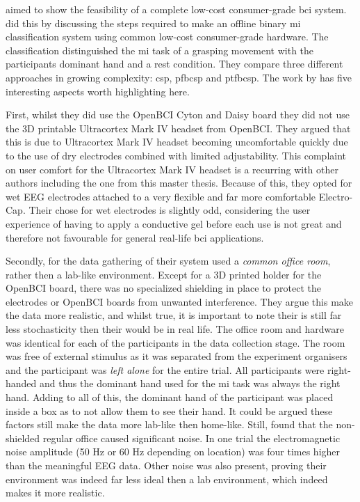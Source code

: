  aimed to show the feasibility of a complete low-cost consumer-grade \gls{bci} system.
 did this by discussing the steps required to make an offline binary \gls{mi} classification system using common low-cost consumer-grade hardware.
The classification distinguished the \gls{mi} task of a grasping movement with the participants dominant hand and a rest condition.
They compare three different approaches in growing complexity: \gls{csp}, \gls{pfbcsp} and \gls{ptfbcsp}.
The work by \citet{cheap_bci_feasibility} has five interesting aspects worth highlighting here.

First, whilst they did use the OpenBCI Cyton and Daisy board they did not use the 3D printable Ultracortex Mark IV headset from OpenBCI.
They argued that this is due to Ultracortex Mark IV headset becoming uncomfortable quickly due to the use of dry electrodes combined with limited adjustability.
This complaint on user comfort for the Ultracortex Mark IV headset is a recurring with other authors including the one from this master thesis.
Because of this, they opted for wet EEG electrodes attached to a very flexible and far more comfortable Electro-Cap.
Their chose for wet electrodes is slightly odd, considering the user experience of having to apply a conductive gel before each use is not great and therefore not favourable for general real-life \gls{bci} applications.

Secondly, for the data gathering of their system \citet{cheap_bci_feasibility} used a \textit{common office room}, rather then a lab-like environment.
Except for a 3D printed holder for the OpenBCI board, there was no specialized shielding in place to protect the electrodes or OpenBCI boards from unwanted interference.
They argue this make the data more realistic, and whilst true, it is important to note their is still far less stochasticity then their would be in real life.
The office room and hardware was identical for each of the participants in the data collection stage.
The room was free of external stimulus as it was separated from the experiment organisers and the participant was \textit{left alone} for the entire trial.
All participants were right-handed and thus the dominant hand used for the \gls{mi} task was always the right hand.
Adding to all of this, the dominant hand of the participant was placed inside a box as to not allow them to see their hand.
It could be argued these factors still make the data more lab-like then home-like.
Still, \citet{cheap_bci_feasibility} found that the non-shielded regular office caused significant noise.
In one trial the electromagnetic noise amplitude (50 Hz or 60 Hz depending on location) was four times higher than the meaningful EEG data.
Other noise was also present, proving their environment was indeed far less ideal then a lab environment, which indeed makes it more realistic.

